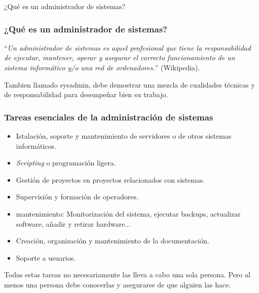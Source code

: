 \documentclass{beamer}
\begin{document}
\begin{frame}

\begin{center}
\huge{¿Qué es un administrador de sistemas?}
\end{center}

\end{frame}



\begin{frame}
\frametitle{¿Qué es un administrador de sistemas?}

``\textit{Un administrador de sistemas es aquel profesional que tiene la responsabilidad de ejecutar, mantener, operar y asegurar el correcto funcionamiento de un sistema informático y/o una red de ordenadores.}'' (Wikipedia).

\bigskip

Tambien llamado \alert{sysadmin}, debe demostrar una mezcla de \alert{cualidades técnicas} y de \alert{responsabilidad} para desempeñar bien su trabajo. 

\end{frame}


\begin{frame}
\frametitle{Tareas esenciales de la administración de sistemas}

\begin{itemize}
\item Istalación, soporte y mantenimiento de servidores o de otros sistemas informáticos.
\item \textit{Scripting} o programación ligera. 
\item Gestión de proyectos en proyectos relacionados con sistemas. 
\item Supervisión y formación de operadores. 
\item mantenimiento: Monitorización del sistema, ejecutar backups, actualizar software, añadir y retirar hardware...
\item Creación, organización y mantenimiento de la documentación.
\item Soporte a usuarios.
\end{itemize}

\small

Todas estas tareas no necesariamente las lleva a cabo una sola persona. Pero al menos una persona debe conocerlas y asegurarse de que alguien las hace.

\end{frame}
\end{document}

